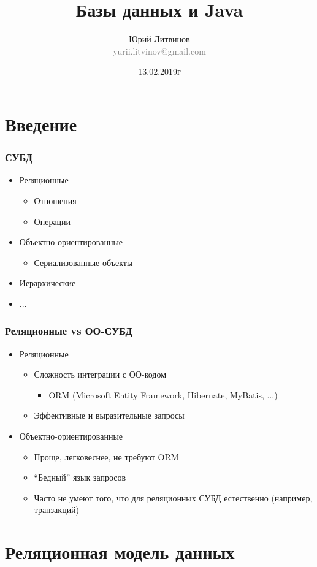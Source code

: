 \documentclass[xetex,mathserif,serif]{beamer}
\title{Базы данных и Java}
\author[Юрий Литвинов]{Юрий Литвинов\\\small{\textcolor{gray}{yurii.litvinov@gmail.com}}}
\date{13.02.2019г}
\begin{document}
	\frame{\titlepage}

	\section{Введение}

	\begin{frame}
		\frametitle{СУБД}
		\begin{itemize}
			\item Реляционные
			\begin{itemize}
				\item Отношения
				\item Операции
			\end{itemize}
			\item Объектно-ориентированные
			\begin{itemize}
				\item Сериализованные объекты
			\end{itemize}
			\item Иерархические
			\item ...
		\end{itemize}
	\end{frame}

	\begin{frame}
		\frametitle{Реляционные vs ОО-СУБД}
		\begin{itemize}
			\item Реляционные
			\begin{itemize}
				\item Сложность интеграции с ОО-кодом
				\begin{itemize}
					\item ORM (Microsoft Entity Framework, Hibernate, MyBatis, ...)
				\end{itemize}
				\item Эффективные и выразительные запросы
			\end{itemize}
			\item Объектно-ориентированные
			\begin{itemize}
				\item Проще, легковеснее, не требуют ORM
				\item ``Бедный'' язык запросов
				\item Часто не умеют того, что для реляционных СУБД естественно (например, транзакций)
			\end{itemize}
		\end{itemize}
	\end{frame}

	\section{Реляционная модель данных}
\end{document}
